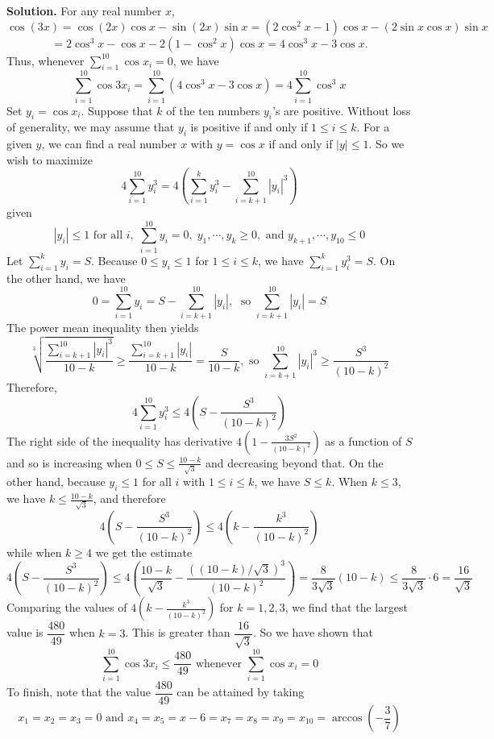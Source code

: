 \documentclass[11pt,a4paper]{article}
\newcommand{\<}{\langle}
\renewcommand{\>}{\rangle}
\begin{document}
\begin{enumerate}
	\textbf{Solution.} 
	For any real number $x$, 
	\[
	\cos(3x) = 
	\cos(2x) \cos x
	 - \sin(2x) \sin x 
	 = (2 \cos^2 x - 1) \cos x - (2 \sin x \cos x) \sin x
	\]
	\[
	= 2 \cos^3 x - \cos x - 2(1 - \cos^2 x) \cos x = 4 \cos^3 x - 3 \cos x.
	\]
	Thus, whenever $\sum_{i=1}^{10} \cos x_i=0$, we have 
	\[
	\sum_{i=1}^{10} \cos 3x_i
	=\sum_{i=1}^{10} (4 \cos^3 x - 3 \cos x)
	=4\sum_{i=1}^{10}\cos^3 x
	\]
	Set $y_i=\cos x_i$. 
	Suppose that $k$ of the ten numbers $y_i$'s are positive. 
	Without loss of generality, we may assume that $y_i$ is positive if and only if $1\le i\le k$. 
	For a given $y$, we can find a real number $x$ with $y = \cos x$ if and only if $|y| \le 1$. 
	So we wish to maximize 
	\[
	4\sum_{i=1}^{10}y_i^3
	=4\left(\sum_{i=1}^{k} y_i^3 - \sum_{i=k+1}^{10} |y_i|^3\right)
	\]
	given 
	\[
	|y_i|\le 1\text{ for all } i, \; \sum_{i=1}^{10} y_i=0, \;
	y_1, \cdots, y_k\ge 0, \text{ and }
	y_{k+1}, \cdots, y_{10}\le 0
	\]
	Let $\sum_{i=1}^{k} y_i=S$. 
	Because $0\le y_i\le 1$ for $1\le i\le k$, 
	we have $\sum_{i=1}^{k} y_i^3=S$. 
	On the other hand, we have 
	\[
	0 = \sum_{i=1}^{10} y_i = S - \sum_{i=k+1}^{10} |y_i|, \;
	\text{ so } \sum_{i=k+1}^{10} |y_i| = S
	\]
	The power mean inequality then yields 
	\[
	\sqrt[3]{\frac{\sum_{i=k+1}^{10} |y_i|^3}{10-k}}
	\ge \frac{\sum_{i=k+1}^{10} |y_i|}{10-k}
	=\frac{S}{10-k},
	\text{ so }
	\sum_{i=k+1}^{10} |y_i|^3\ge\frac{S^3}{(10-k)^2}
	\]
	Therefore, 
	\[
	4\sum_{i=1}^{10}y_i^3
	\le 
	4\left(S - \frac{S^3}{(10-k)^2}\right)
	\]
	The right side of the inequality has derivative 
	$4(1-\frac{3S^2}{(10-k)^2})$ as a function of $S$ 
	and so is increasing when $0\le S\le \frac{10-k}{\sqrt{3}}$ and decreasing beyond that. 
	On the other hand, because $y_i\le 1$ for all $i$ with $1\le i\le k$, we have 
	$S\le k$. 
	When $k\le 3$, we have $k\le \frac{10-k}{\sqrt{3}}$, and therefore 
	\[
	4\left(S - \frac{S^3}{(10-k)^2}\right)
	\le 4\left(k - \frac{k^3}{(10-k)^2}\right)
	\]
	while when $k\ge 4$ we get the estimate 
	\[
	4\left(S - \frac{S^3}{(10-k)^2}\right)
	\le 
	4\left(\frac{10-k}{\sqrt{3}} - \frac{((10-k)/\sqrt{3})^3}{(10-k)^2}\right)
	=\frac{8}{3\sqrt{3}}(10-k)
	\le \frac{8}{3\sqrt{3}}\cdot 6
	=\frac{16}{\sqrt{3}}
	\]
	Comparing the values of 
	$4\left(k - \frac{k^3}{(10-k)^2}\right)$ for $k=1, 2, 3$, 
	we find that the largest value is $\dfrac{480}{49}$
	when $k=3$. This is greater than $\dfrac{16}{\sqrt{3}}$. 
	So we have shown that 
	\[
	\sum_{i=1}^{10}\cos 3x_i\le \frac{480}{49}
	\text{ whenever }
	\sum_{i=1}^{10}\cos x_i = 0
	\]
	To finish, note that the value $\dfrac{480}{49}$ can be attained by taking 
	\[
	x_1=x_2=x_3=0
	\text{ and }
	x_4=x_5=x-6=x_7=x_8=x_9=x_{10}=\arccos\left(-\frac{3}{7}\right)
	\]
	

\end{enumerate}
\end{document}
